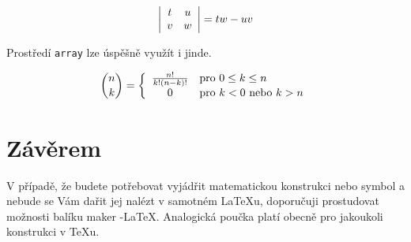 \documentclass[11pt,a4paper, twocolumn]{article}
\theoremstyle{definition}
\theoremstyle{plain}
\begin{document}
\[ \left|
\begin{array}{c c}
  t & u \\
  v & w
\end{array}
\right|
= tw - uv \]

Prostředí \verb|array| lze úspěšně využít i jinde.

\[ {n \choose k} = \left\{ 
  \begin{array}{c l}
    {n! \over k!(n-k)!} & \text{pro $0 \leq k \leq n$}\\
    0 & \text{pro $k < 0$ nebo $k > n$}
  \end{array} \right.
\]

\section{Závěrem}

V případě, že budete potřebovat vyjádřit matematickou konstrukci nebo symbol a nebude se Vám dařit jej nalézt v samotném {\LaTeX}u, doporučuji prostudovat možnosti balíku maker \AmS-\LaTeX.
Analogická poučka platí obecně pro jakoukoli konstrukci v {\TeX}u.
\end{document}
